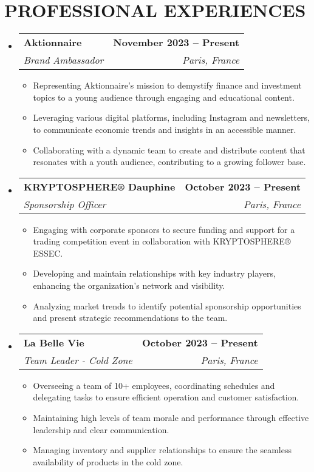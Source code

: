 \documentclass[letterpaper,11pt]{article}
\makeatletter
\newcommand{\resumeItem}[1]{
  \item\small{
    {#1 \vspace{-2pt}}
  }
}
\newcommand{\resumeSubheading}[4]{
  \vspace{-2pt}\item
    \begin{tabular*}{1.0\textwidth}[t]{l@{\extracolsep{\fill}}r}
      \textbf{#1} & \textbf{\small #2} \\
      \textit{\small#3} & \textit{\small #4} \\
    \end{tabular*}\vspace{-7pt}
}
\newcommand{\resumeSubHeadingListStart}{\begin{itemize}[leftmargin=0.0in, label={}]}
\newcommand{\resumeSubHeadingListEnd}{\end{itemize}}
\newcommand{\resumeItemListStart}{\begin{itemize}}
\newcommand{\resumeItemListEnd}{\end{itemize}\vspace{-5pt}}
\makeatother
\begin{document}
\section{PROFESSIONAL EXPERIENCES}
  \resumeSubHeadingListStart

    \resumeSubheading
  {Aktionnaire}{November 2023 -- Present}
  {Brand Ambassador}{Paris, France}
  \resumeItemListStart
    \resumeItem{Representing Aktionnaire’s mission to demystify finance and investment topics to a young audience through engaging and educational content.}
    \resumeItem{Leveraging various digital platforms, including Instagram and newsletters, to communicate economic trends and insights in an accessible manner.}
    \resumeItem{Collaborating with a dynamic team to create and distribute content that resonates with a youth audience, contributing to a growing follower base.}
  \resumeItemListEnd
    \resumeSubheading
      {KRYPTOSPHERE® Dauphine}{October 2023 -- Present}
      {Sponsorship Officer}{Paris, France}
      \resumeItemListStart
        \resumeItem{Engaging with corporate sponsors to secure funding and support for a trading competition event in collaboration with KRYPTOSPHERE® ESSEC.}
        \resumeItem{Developing and maintain relationships with key industry players, enhancing the organization's network and visibility.}
        \resumeItem{Analyzing market trends to identify potential sponsorship opportunities and present strategic recommendations to the team.}
      \resumeItemListEnd

    \resumeSubheading
  {La Belle Vie}{October 2023 -- Present}
  {Team Leader - Cold Zone}{Paris, France}
  \resumeItemListStart
    \resumeItem{Overseeing a team of 10+ employees, coordinating schedules and delegating tasks to ensure efficient operation and customer satisfaction.}
    \resumeItem{Maintaining high levels of team morale and performance through effective leadership and clear communication.}
    \resumeItem{Managing inventory and supplier relationships to ensure the seamless availability of products in the cold zone.}
  \resumeItemListEnd


    
      
    

  \resumeSubHeadingListEnd

\end{document}
